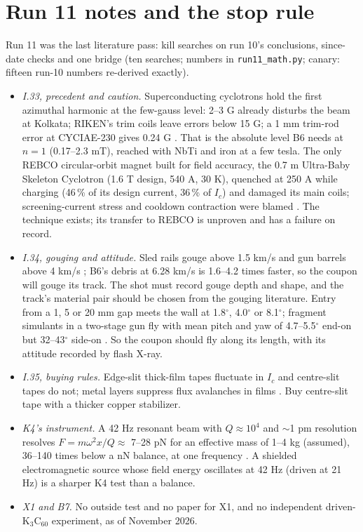 \section*{Run 11 notes and the stop rule}
\noindent Run 11 was the last literature pass: kill searches on run 10's conclusions, since-date checks and one bridge (ten searches; numbers
in \texttt{run11\_math.py}; canary: fifteen run-10 numbers re-derived exactly).
\begin{itemize}
\item \emph{I.33, precedent and caution.} Superconducting cyclotrons hold the first azimuthal harmonic at the few-gauss level: 2--3 G already
disturbs the beam at Kolkata; RIKEN's trim coils leave errors below 15 G; a 1 mm trim-rod error at CYCIAE-230 gives 0.24 G \cite{cyclotrons}.
That is the absolute level B6 needs at $n=1$ (0.17--2.3 mT), reached with NbTi and iron at a few tesla. The only REBCO circular-orbit magnet
built for field accuracy, the 0.7 m Ultra-Baby Skeleton Cyclotron (1.6 T design, 540 A, 30 K), quenched at 250 A while charging (46\,\% of its
design current, 36\,\% of $I_c$) and damaged its main coils; screening-current stress and cooldown contraction were blamed \cite{ubsc}. The
technique exists; its transfer to REBCO is unproven and has a failure on record.
\item \emph{I.34, gouging and attitude.} Sled rails gouge above 1.5 km/s and gun barrels above 4 km/s \cite{gouging}; B6's debris at 6.28 km/s
is 1.6--4.2 times faster, so the coupon will gouge its track. The shot must record gouge depth and shape, and the track's material pair should
be chosen from the gouging literature. Entry from a 1, 5 or 20 mm gap meets the wall at 1.8$^\circ$, 4.0$^\circ$ or 8.1$^\circ$; fragment
simulants in a two-stage gun fly with mean pitch and yaw of 4.7--5.5$^\circ$ end-on but 32--43$^\circ$ side-on \cite{fsp}. So the coupon should
fly along its length, with its attitude recorded by flash X-ray.
\item \emph{I.35, buying rules.} Edge-slit thick-film tapes fluctuate in $I_c$ and centre-slit tapes do not; metal layers suppress flux
avalanches in films \cite{jaroszynski25,avalanche}. Buy centre-slit tape with a thicker copper stabilizer.
\item \emph{K4's instrument.} A 42 Hz resonant beam with $Q\approx10^4$ and $\sim$1 pm resolution resolves $F=m\omega^2x/Q\approx$ 7--28 pN for an
effective mass of 1--4 kg (assumed), 36--140 times below a nN balance, at one frequency \cite{brack22,brack23}. A shielded electromagnetic
source whose field energy oscillates at 42 Hz (driven at 21 Hz) is a sharper K4 test than a balance.
\item \emph{X1 and B7.} No outside test and no paper for X1, and no independent driven-K$_3$C$_{60}$ experiment, as of November 2026.
\end{itemize}
